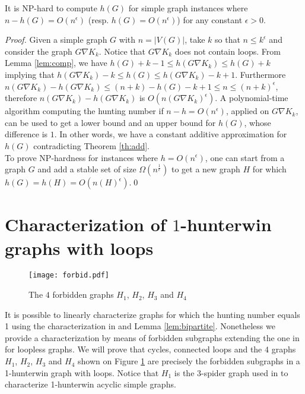 \documentclass[runningheads]{llncs}
\begin{document}
\begin{theorem}
It is NP-hard to compute $h(G)$ for simple graph instances where  $n - h(G) = O(n^{\epsilon})$ (resp. $h(G) = O(n^{\epsilon})$) for any constant $\epsilon > 0$.
\end{theorem}
\begin{proof}
Given a simple graph $G$ with $n = |V(G)|$, take $k$ so that $n \le k^{\epsilon}$ and  consider the graph $G \nabla {K}_k$.  Notice that $G \nabla {K}_k$ does not contain loops.  
From Lemma \ref{lem:comp}, we have $h(G)+k-1 \leq h(G \nabla {K}_k)  \leq  h(G) +k$ implying that {$h(G \nabla {K}_k) -k \leq  h(G) \leq  h(G \nabla {K}_k) -k+1$.} Furthermore $n(G \nabla {K}_k) - h(G \nabla {K}_k) \leq  (n+k)- h(G) -k+1\le n \le (n+k)^{\epsilon}$, therefore  $n(G \nabla {K}_k) - h(G \nabla {K}_k)$ is $O(n(G \nabla {K}_k)^{\epsilon})$.   A polynomial-time algorithm  computing the {hunting number} if  {$n-h=O(n^{\epsilon})$, applied on $G \nabla {K}_k$,} can  be used to get a lower bound and an upper bound for $h(G)$, whose difference   is $1$. In other words, we have a constant additive  approximation for $h(G)$ contradicting Theorem \ref{th:add}. \\
To prove NP-hardness for instances where $h = O(n^{\epsilon})$, one can start from a graph $G$ and add a stable set of size $\Omega(n^{\frac{1}{\epsilon}})$ to get a new graph $H$ for which $h(G) = h(H) = O(n(H)^{\epsilon})$.\qed\end{proof}



\section{Characterization of $1$-hunterwin graphs with loops}

\begin{figure}
    \centering
    \vspace{-5mm}
    \texttt{[image: forbid.pdf]}
    \caption{The $4$ forbidden graphs $H_1$, $H_2$, $H_3$ and $H_4$}
    \label{fig:forbid}
\end{figure}
It is possible to linearly characterize graphs for which the {hunting number} equals 1 using the characterization in \cite{journals/combinatorics/BritnellW13,HASLEGRAVE20141} and Lemma \ref{lem:bipartite}. Nonetheless we provide a characterization by means of forbidden subgraphs extending the one in \cite{journals/combinatorics/BritnellW13,HASLEGRAVE20141} for loopless graphs. {We will prove that  cycles, connected loops and the $4$ graphs $H_1$, $H_2$, $H_3$ and $H_4$ shown on Figure \ref{fig:forbid} are precisely the forbidden subgraphs in a 1-hunterwin graph with loops.  Notice that $H_1$ is the $3$-spider graph used in \cite{journals/combinatorics/BritnellW13,HASLEGRAVE20141} to characterize 1-hunterwin acyclic simple graphs.}
\end{document}
